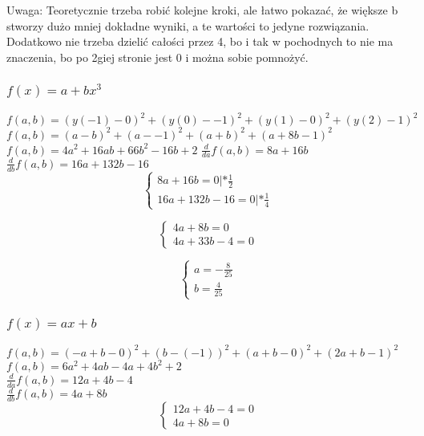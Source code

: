\documentclass{article}
\begin{document}
Uwaga: Teoretycznie trzeba robić kolejne kroki, ale łatwo pokazać, że większe b stworzy dużo mniej dokładne wyniki, a te wartości to jedyne rozwiązania. Dodatkowo nie trzeba dzielić całości przez 4, bo i tak w pochodnych to nie ma znaczenia, bo po 2giej stronie jest 0 i można sobie pomnożyć.

\subsubsection{$f(x)=a+bx^3$}
$f(a,b) = (y(-1)-0)^2 + (y(0)- -1)^2 + (y(1)-0)^2 + (y(2)-1)^2$\\
$f(a,b) = (a-b)^2 + (a- -1)^2 + (a+b)^2 + (a+8b-1)^2$\\
$f(a,b) = 4a^2+16ab+66b^2-16b+2$
$\frac{d}{da}f(a,b)=8a+16b$\\
$\frac{d}{db}f(a,b)=16a+132b-16$\\

\begin{equation*}\begin{cases}
    8a+16b=0 |*\frac{1}{2}\\
    16a+132b-16=0  |*\frac{1}{4}
\end{cases}\end{equation*}

\begin{equation*}\begin{cases}
    4a+8b=0\\
    4a+33b-4=0
\end{cases}\end{equation*}

\begin{equation*}\begin{cases}
    a=-\frac{8}{25}\\
    b=\frac{4}{25}
\end{cases}\end{equation*}

\subsubsection{$f(x) = ax+b$}
$f(a,b)=(-a+b-0)^2+(b-(-1))^2+(a+b-0)^2+(2a+b-1)^2$\\
$f(a,b)=6a^2+4ab-4a+4b^2+2$\\
$\frac{d}{da}f(a,b)=12a+4b-4$\\
$\frac{d}{db}f(a,b)=4a+8b$\\

\begin{equation*}\begin{cases}
    12a+4b-4=0\\
    4a+8b=0
\end{cases}\end{equation*}
\end{document}
